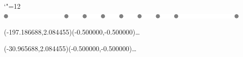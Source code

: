 \setlength{\unitlength}{1pt}%
\makeatletter%
\let\ASYencoding\f@encoding%
\let\ASYfamily\f@family%
\let\ASYseries\f@series%
\let\ASYshape\f@shape%
\makeatother%
{\catcode`"=12%
\includegraphics{teamfermat1_0}%
}%
%
\fontsize{12.000000}{14.400000}\selectfont%
\usefont{\ASYencoding}{\ASYfamily}{\ASYseries}{\ASYshape}%
\ASYalign(-197.186688,2.084455)(-0.500000,-0.500000){\ldots}%
%
\fontsize{12.000000}{14.400000}\selectfont%
\ASYalign(-30.965688,2.084455)(-0.500000,-0.500000){\ldots}%
